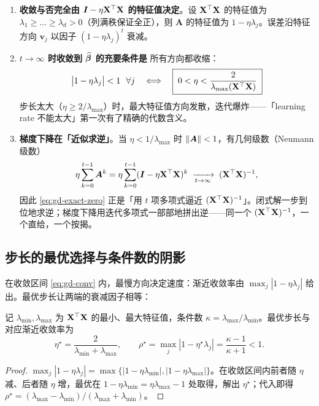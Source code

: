 \begin{enumerate}[label=(\arabic*)]
  \item \textbf{收敛与否完全由 $\bm{I} - \eta\mathbf{X}^\top\mathbf{X}$ 的特征值决定}。设 $\mathbf{X}^\top\mathbf{X}$ 的特征值为 $\lambda_1 \ge \dots \ge \lambda_d > 0$（列满秩保证全正），则 $\bm{A}$ 的特征值为 $1 - \eta \lambda_j$。误差沿特征方向 $\bm{v}_j$ 以因子 $(1 - \eta\lambda_j)^t$ 衰减。
  \item \textbf{$t \to \infty$ 时收敛到 $\widehat{\bm{\beta}}$ 的充要条件是} 所有方向都收缩：
  \begin{equation}\label{eq:gd-conv}
    \big| 1 - \eta \lambda_j \big| < 1 \ \ \forall j
    \quad\Longleftrightarrow\quad
    \boxed{\;0 < \eta < \frac{2}{\lambda_{\max}(\mathbf{X}^\top\mathbf{X})}\;}
  \end{equation}
  步长太大（$\eta \ge 2/\lambda_{\max}$）时，最大特征值方向发散，迭代爆炸——「learning rate 不能太大」第一次有了精确的代数含义。
  \item \textbf{梯度下降在「近似求逆」}。当 $\eta < 1/\lambda_{\max}$ 时 $\left\lVert \bm{A} \right\rVert < 1$，有几何级数（Neumann 级数）
  \[
    \eta \sum_{k=0}^{t-1} \bm{A}^k = \eta \sum_{k=0}^{t-1} (\bm{I} - \eta \mathbf{X}^\top \mathbf{X})^k
    \;\xrightarrow[t \to \infty]{}\; (\mathbf{X}^\top \mathbf{X})^{-1},
  \]
  因此 \eqref{eq:gd-exact-zero} 正是「用 $t$ 项多项式逼近 $(\mathbf{X}^\top\mathbf{X})^{-1}$」。闭式解一步到位地求逆；梯度下降用迭代多项式一部部地拼出逆——同一个 $(\mathbf{X}^\top\mathbf{X})^{-1}$，一个直给，一个按揭。
\end{enumerate}

\subsection{步长的最优选择与条件数的阴影}\label{sec:gd-rate}

在收敛区间 \eqref{eq:gd-conv} 内，最慢方向决定速度：渐近收敛率由 $\max_j |1 - \eta \lambda_j|$ 给出。最优步长让两端的衰减因子相等：

\begin{corollary}[最优步长与收敛率]\label{thm:gd-opt}
记 $\lambda_{\min}, \lambda_{\max}$ 为 $\mathbf{X}^\top\mathbf{X}$ 的最小、最大特征值，条件数 $\kappa = \lambda_{\max}/\lambda_{\min}$。最优步长与对应渐近收敛率为
\begin{equation}\label{eq:gd-opt}
  \eta^\star = \frac{2}{\lambda_{\min} + \lambda_{\max}},
  \qquad
  \rho^\star = \max_j |1 - \eta^\star \lambda_j| = \frac{\kappa - 1}{\kappa + 1} < 1 .
\end{equation}
\end{corollary}
\begin{proof}
$\max_j |1 - \eta\lambda_j| = \max\{|1 - \eta\lambda_{\min}|, |1 - \eta\lambda_{\max}|\}$。在收敛区间内前者随 $\eta$ 减、后者随 $\eta$ 增，最优在 $1 - \eta\lambda_{\min} = \eta\lambda_{\max} - 1$ 处取得，解出 $\eta^\star$；代入即得 $\rho^\star = (\lambda_{\max} - \lambda_{\min})/(\lambda_{\max} + \lambda_{\min})$。
\end{proof}

